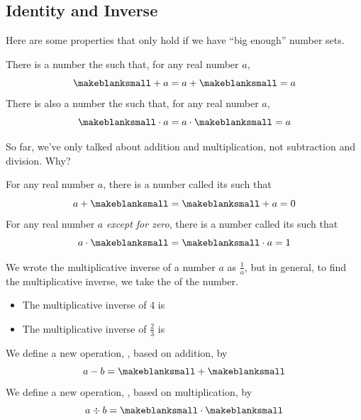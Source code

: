 \subsection{Identity and Inverse} 
Here are some properties that only hold if we have ``big enough'' number sets.
\begin{displaybox}[Identity]
There is a number \makeblanksmall the  such that, for any real number $a$,
\[
\makeblanksmall+a=a+\makeblanksmall=a
\]
There is also a number \makeblanksmall the  such that, for any real number $a$,
\[
\makeblanksmall\cdot a=a\cdot\makeblanksmall=a
\]
\end{displaybox}
So far, we've only talked about addition and multiplication, not subtraction and division. Why?
\begin{displaybox}[Inverse]
For any real number $a$, there is a number \makeblanksmall called its  such that
\[
a+\makeblanksmall = \makeblanksmall+a = 0
\]
For any real number $a$ \emph{except for zero}, there is a number \makeblanksmall called its  such that
\[
a\cdot\makeblanksmall = \makeblanksmall\cdot a=1
\]
\end{displaybox}
\begin{Note}
We wrote the multiplicative inverse of a number $a$ as $\frac{1}{a}$, but in general, to find the multiplicative inverse, we take the \makeblank[1.5in] of the number.
\begin{itemize}
\item The multiplicative inverse of $4$ is \makeblanksmall
\item The multiplicative inverse of $\frac{2}{3}$ is \makeblanksmall
\end{itemize}
\end{Note}
\begin{definition}
We define a new operation, , based on addition, by
\[
a-b=\makeblanksmall + \makeblanksmall
\]
We define a new operation, , based on multiplication, by
\[
a\div b=\makeblanksmall\cdot\makeblanksmall
\]
\end{definition}
